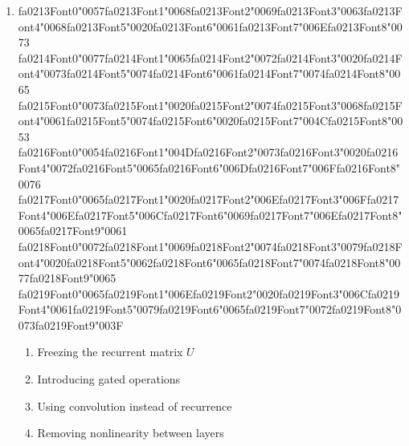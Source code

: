 \documentclass[12pt]{article}
\begin{document}
\begin{enumerate}[label=Q\arabic*.]
 \item {\csname fa0213Font0\endcsname\char"0057}{\csname fa0213Font1\endcsname\char"0068}{\csname fa0213Font2\endcsname\char"0069}{\csname fa0213Font3\endcsname\char"0063}{\csname fa0213Font4\endcsname\char"0068}{\csname fa0213Font5\endcsname\char"0020}{\csname fa0213Font6\endcsname\char"0061}{\csname fa0213Font7\endcsname\char"006E}{\csname fa0213Font8\endcsname\char"0073} {\csname fa0214Font0\endcsname\char"0077}{\csname fa0214Font1\endcsname\char"0065}{\csname fa0214Font2\endcsname\char"0072}{\csname fa0214Font3\endcsname\char"0020}{\csname fa0214Font4\endcsname\char"0073}{\csname fa0214Font5\endcsname\char"0074}{\csname fa0214Font6\endcsname\char"0061}{\csname fa0214Font7\endcsname\char"0074}{\csname fa0214Font8\endcsname\char"0065} {\csname fa0215Font0\endcsname\char"0073}{\csname fa0215Font1\endcsname\char"0020}{\csname fa0215Font2\endcsname\char"0074}{\csname fa0215Font3\endcsname\char"0068}{\csname fa0215Font4\endcsname\char"0061}{\csname fa0215Font5\endcsname\char"0074}{\csname fa0215Font6\endcsname\char"0020}{\csname fa0215Font7\endcsname\char"004C}{\csname fa0215Font8\endcsname\char"0053} {\csname fa0216Font0\endcsname\char"0054}{\csname fa0216Font1\endcsname\char"004D}{\csname fa0216Font2\endcsname\char"0073}{\csname fa0216Font3\endcsname\char"0020}{\csname fa0216Font4\endcsname\char"0072}{\csname fa0216Font5\endcsname\char"0065}{\csname fa0216Font6\endcsname\char"006D}{\csname fa0216Font7\endcsname\char"006F}{\csname fa0216Font8\endcsname\char"0076} {\csname fa0217Font0\endcsname\char"0065}{\csname fa0217Font1\endcsname\char"0020}{\csname fa0217Font2\endcsname\char"006E}{\csname fa0217Font3\endcsname\char"006F}{\csname fa0217Font4\endcsname\char"006E}{\csname fa0217Font5\endcsname\char"006C}{\csname fa0217Font6\endcsname\char"0069}{\csname fa0217Font7\endcsname\char"006E}{\csname fa0217Font8\endcsname\char"0065}{\csname fa0217Font9\endcsname\char"0061} {\csname fa0218Font0\endcsname\char"0072}{\csname fa0218Font1\endcsname\char"0069}{\csname fa0218Font2\endcsname\char"0074}{\csname fa0218Font3\endcsname\char"0079}{\csname fa0218Font4\endcsname\char"0020}{\csname fa0218Font5\endcsname\char"0062}{\csname fa0218Font6\endcsname\char"0065}{\csname fa0218Font7\endcsname\char"0074}{\csname fa0218Font8\endcsname\char"0077}{\csname fa0218Font9\endcsname\char"0065} {\csname fa0219Font0\endcsname\char"0065}{\csname fa0219Font1\endcsname\char"006E}{\csname fa0219Font2\endcsname\char"0020}{\csname fa0219Font3\endcsname\char"006C}{\csname fa0219Font4\endcsname\char"0061}{\csname fa0219Font5\endcsname\char"0079}{\csname fa0219Font6\endcsname\char"0065}{\csname fa0219Font7\endcsname\char"0072}{\csname fa0219Font8\endcsname\char"0073}{\csname fa0219Font9\endcsname\char"003F}
 \begin{enumerate}[label=(\Alph*)]
     \item Freezing the recurrent matrix $U$
     \item Introducing gated operations
     \item Using convolution instead of recurrence
     \item Removing nonlinearity between layers
 \end{enumerate}
 

\end{enumerate}
\end{document}
